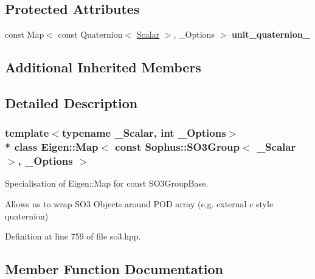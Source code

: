 \subsection*{Protected Attributes}
\begin{DoxyCompactItemize}
\item 
const Map$<$ const Quaternion$<$ \hyperlink{class_eigen_1_1_map_3_01const_01_sophus_1_1_s_o3_group_3_01___scalar_01_4_00_01___options_01_4_ab140bd002784cc47ef5472ddc8932d9d}{Scalar} $>$, \+\_\+\+Options $>$ {\bfseries unit\+\_\+quaternion\+\_\+}\hypertarget{class_eigen_1_1_map_3_01const_01_sophus_1_1_s_o3_group_3_01___scalar_01_4_00_01___options_01_4_a02b78b9c0d1c4f37f0cf74f267adbe46}{}\label{class_eigen_1_1_map_3_01const_01_sophus_1_1_s_o3_group_3_01___scalar_01_4_00_01___options_01_4_a02b78b9c0d1c4f37f0cf74f267adbe46}

\end{DoxyCompactItemize}
\subsection*{Additional Inherited Members}


\subsection{Detailed Description}
\subsubsection*{template$<$typename \+\_\+\+Scalar, int \+\_\+\+Options$>$\\*
class Eigen\+::\+Map$<$ const Sophus\+::\+S\+O3\+Group$<$ \+\_\+\+Scalar $>$, \+\_\+\+Options $>$}

Specialisation of Eigen\+::\+Map for const S\+O3\+Group\+Base. 

Allows us to wrap S\+O3 Objects around P\+OD array (e.\+g. external c style quaternion) 

Definition at line 759 of file so3.\+hpp.



\subsection{Member Function Documentation}
